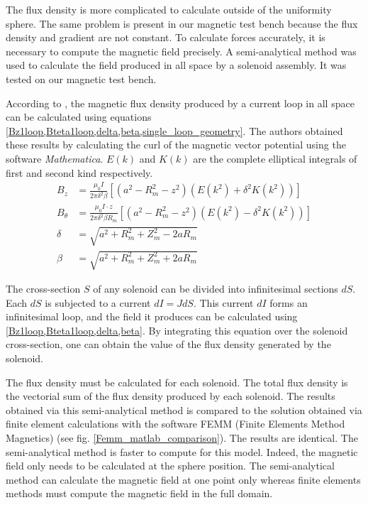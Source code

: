 \documentclass[letterpaper, 10 pt, conference]{ieeeconf}  %
\begin{document}
The flux density is more complicated to calculate outside of the uniformity sphere. The same problem is present in our magnetic test bench because the flux density and gradient are not constant. To calculate forces accurately, it is necessary to compute the magnetic field precisely. A semi-analytical method was used to calculate the field produced in all space by a solenoid assembly. It was tested on our magnetic test bench.\par
According to \cite{simpson2001simple}, the magnetic flux density produced by a current loop in all space can be calculated using equations \cref{Bz1loop,Bteta1loop,delta,beta,single_loop_geometry}. The authors obtained these results by calculating the curl of the magnetic vector potential using the software \textit{Mathematica}.  $E(k)$ and $K(k)$ are the complete elliptical integrals of first and second kind respectively.
\begin{align}
B_z &=\frac{\mu _0I}{2\pi\delta ^{2}\beta  }\left [ \left ( a^2-R_m ^2-z^2 \right )(E(k^2)+\delta ^2K(k^2)) \right ] 
\label{Bz1loop}\\
B_\theta &=\frac{\mu _0 I \cdot z}{2\pi\delta ^{2}\beta R_m   }\left [ \left ( a^2-R_m ^2-z^2 \right )(E(k^2)-\delta ^2K(k^2)) \right ]
\label{Bteta1loop}\\
\delta &=\sqrt{a^2+R_m^2+Z_m^2-2aR_m}
\label{delta}\\
\beta &=\sqrt{a^2+R_m^2+Z_m^2+2aR_m}
\label{beta}
\end{align}

The cross-section $S$ of any solenoid can be divided into infinitesimal sections $dS$. Each $dS$ is subjected to a current $dI=JdS$. This current $dI$ forms an infinitesimal loop, and the field it produces can be calculated using \cref{Bz1loop,Bteta1loop,delta,beta}. By integrating this equation over the solenoid cross-section, one can obtain the value of the flux density generated by the solenoid.\par
The flux density must be calculated for each solenoid. The total flux density is the vectorial sum of the flux density produced by each solenoid. The results obtained via this semi-analytical method is compared to the solution obtained via finite element calculations with the software FEMM (Finite Elements Method Magnetics)\cite{femm} (see fig. \ref{Femm_matlab_comparison}). The results are identical. The semi-analytical method is faster to compute for this model. Indeed, the magnetic field only needs to be calculated at the sphere position. The semi-analytical method can calculate the magnetic field at one point only whereas finite elements methods must compute the magnetic field in the full domain.
\end{document}
